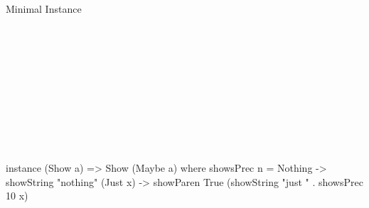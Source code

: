 \documentclass[aspectratio=169]{beamer}
\newcommand\resetVars{
  \def\sourceRatio{.5}
  \def\zoom{1}
  \def\hsFontsize{\normalsize}
  \def\midruleL{-1cm}
  \def\midruleR{.5cm}
  \def\sourceIcon{agda}
}
\def\hsSize{\fpeval{1 - \sourceRatio}}
\def\rightSize{\hsSize\textwidth}
\newcommand\midrule{\hspace{\midruleL}\vrule\hspace{\midruleR}}
\begin{document}
\begin{frame}[fragile]{Minimal Instance}
\hspace{-1cm}
\begin{sourcepage}
\begin{code}%
\>[0]\<%
\\
\>[0][@{}l@{\AgdaIndent{0}}]%
\>[2]\AgdaSpace{}%
\AgdaSymbol{:}\AgdaSpace{}%
\AgdaSymbol{\{\{}\AgdaSpace{}%
\AgdaSymbol{\}\}}\AgdaSpace{}%
\AgdaSpace{}%
\AgdaSpace{}%
\AgdaSymbol{(}\AgdaSpace{}%
\AgdaSymbol{)}\<%
\\
%
\>[2]\AgdaSpace{}%
\AgdaSymbol{\{}\AgdaSpace{}%
\AgdaSymbol{=}\AgdaSpace{}%
\AgdaSymbol{\}}\AgdaSpace{}%
\AgdaSymbol{=}\AgdaSpace{}%
\AgdaSpace{}%
\AgdaSymbol{\{}\AgdaSpace{}%
\AgdaSymbol{\}}\<%
\\
\>[2][@{}l@{\AgdaIndent{0}}]%
\>[4]\<%
\\
\>[4][@{}l@{\AgdaIndent{0}}]%
\>[6]\AgdaSpace{}%
\AgdaSymbol{:}\AgdaSpace{}%
\AgdaSpace{}%
\AgdaSymbol{(}\AgdaSpace{}%
\AgdaSymbol{)}\<%
\\
%
\>[6]\AgdaSpace{}%
\AgdaSpace{}%
\AgdaSpace{}%
\AgdaSymbol{=}\AgdaSpace{}%
\AgdaSpace{}%
\<%
\\
\>[6][@{}l@{\AgdaIndent{0}}]%
\>[8]%
\>[18]\AgdaSpace{}%
\AgdaSpace{}%
\<%
\\
%
\>[8]\AgdaSymbol{(}\AgdaSpace{}%
\AgdaSymbol{)}%
\>[18]\AgdaSpace{}%
\AgdaSpace{}%
\<%
\\
\>[8][@{}l@{\AgdaIndent{0}}]%
\>[10]\AgdaSymbol{(}\AgdaSpace{}%
\AgdaSpace{}%
\AgdaSpace{}%
\AgdaSpace{}%
\AgdaSpace{}%
\AgdaSpace{}%
\AgdaSpace{}%
\AgdaSymbol{)}\<%
\\
\>[0]\AgdaSymbol{\{-\#}\AgdaSpace{}%
\AgdaSpace{}%
\AgdaSpace{}%
\AgdaSpace{}%
\AgdaSymbol{\#-\}}\<%
\end{code}
\end{sourcepage}
\midrule
\begin{minipage}{\rightSize}
\begin{haskellcode}
instance (Show a)
      => Show (Maybe a) where
  showsPrec n = \case
    Nothing -> showString "nothing"
    (Just x) -> showParen True
      (showString "just " . showsPrec 10 x)
\end{haskellcode}
\end{minipage}
\resetVars
\end{frame}
\end{document}
